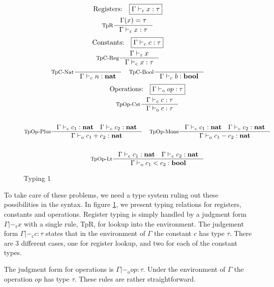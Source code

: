 \documentclass[a4paper, oneside, 10pt, draft]{memoir}
\begin{document}
\newcommand{\tpr}{|-_{\mathrm{r}}}
\newcommand{\tpc}{|-_{\mathrm{c}}}
\newcommand{\tpop}{|-_{\mathrm{o}}}
\newcommand{\tpb}{|-_{\mathrm{b}}}

\begin{figure}
  \begin{gather*}
    \text{Registers:} \quad \boxed{\Gamma \tpr x : \tau}\\
    \inference[TpR]{\Gamma(x) = \tau}{\Gamma \tpr x : \tau}
  \end{gather*}
  \begin{gather*}
    \text{Constants:} \quad \boxed{\Gamma \tpc c : \tau}\\
    \inference[TpC-Reg]{\Gamma \tpr x}{\Gamma \tpc x : \tau}\\
    \inference[TpC-Nat]{}{\Gamma \tpc n : \tnat} \quad
    \inference[TpC-Bool]{}{\Gamma \tpc b : \tbool}
  \end{gather*}
  \begin{gather*}
    \text{Operations:} \quad \boxed{\Gamma \tpop op : \tau} \\
    \inference[TpOp-Cst]{\Gamma \tpc c : \tau}{\Gamma \tpop c : \tau}\\\\
    \inference[TpOp-Plus]{\Gamma \tpc c_1 : \tnat \quad \Gamma
      \tpc c_2 : \tnat}{\Gamma \tpop c_1 + c_2 : \tnat} \quad
    \inference[TpOp-Mone]{\Gamma \tpc c_1 : \tnat \quad \Gamma
      \tpc c_2 : \tnat}{\Gamma \tpop c_1 - c_2 : \tnat}\\\\
    \inference[TpOp-Lt]{\Gamma \tpc c_1 : \tnat \quad \Gamma
      \tpc c_2 : \tnat}{\Gamma \tpop c_1 < c_2 : \tbool}
  \end{gather*}
  \caption{Typing 1}
  \label{fig:type-judgement-1}
\end{figure}

To take care of these problems, we need a type system ruling out these
possibilities in the syntax. In figure \ref{fig:type-judgement-1}, we
present typing relations for registers, constants and
operations. Register typing is simply handled by a judgment form
$\boxed{\Gamma \tpr x}$ with a single rule, TpR, for lookup into the
environment. The judgement form $\boxed{\Gamma \tpc c : \tau}$ states
that in the environment of $\Gamma$ the constant $c$ has type
$\tau$. There are 3 different cases, one for register lookup, and two
for each of the constant types.

The judgment form for operations is $\boxed{\Gamma \tpop op :
  \tau}$. Under the environment of $\Gamma$ the operation $op$ has
type $\tau$. These rules are rather straightforward.
\end{document}
